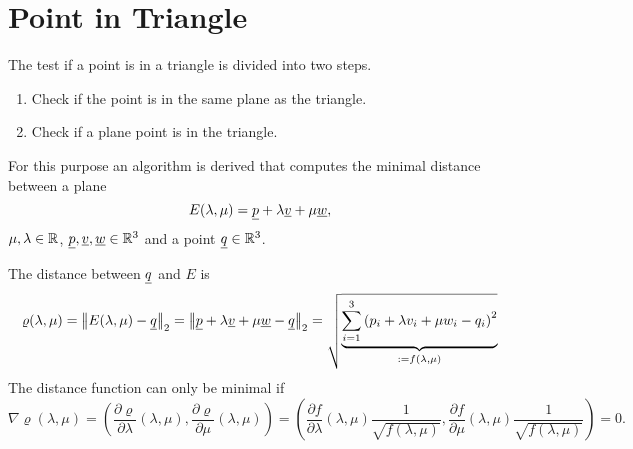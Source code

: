 \section{Point in Triangle}
The test if a point is in a triangle is divided into two steps.
\begin{enumerate}
\item Check if the point is in the same plane as the triangle.
\item Check if a plane point is in the triangle.
\end{enumerate}
For this purpose an algorithm is derived that computes
the minimal distance between a plane
\begin{equation*}
E(\lambda, \mu) = \vp + \lambda \vv + \mu \vw,
\end{equation*}
$\mu, \lambda \in \mathbb{R}$, $\vp, \vv, \vw \in \R^3$ and a point $\vq \in \R^3$.

The distance between $\vq$ and $E$ is
\begin{equation*}
\varrho(\lambda, \mu) = \vnorm{E(\lambda,\mu) - \vq}_2
	= \vnorm{\vp + \lambda \vv + \mu \vw - \vq}_2
	= \sqrt{\underbrace{\sum_{i=1}^3
		\left( p_i + \lambda v_i + \mu w_i - q_i\right)^2}_{:= f(\lambda,\mu)}}
\end{equation*}
The distance function can only be minimal if
\begin{equation*}
\nabla \varrho (\lambda, \mu) = \left(
	\dfrac{\partial \varrho}{\partial \lambda} (\lambda, \mu),
	\dfrac{\partial \varrho}{\partial \mu} (\lambda, \mu)
	\right)
	= \left(
	\dfrac{\partial f}{\partial \lambda}(\lambda, \mu)
		\dfrac{1}{\sqrt{f(\lambda, \mu)}},
	\dfrac{\partial f}{\partial \mu}(\lambda, \mu)
		\dfrac{1}{\sqrt{f(\lambda, \mu)}} \right) = 0.
\end{equation*}

